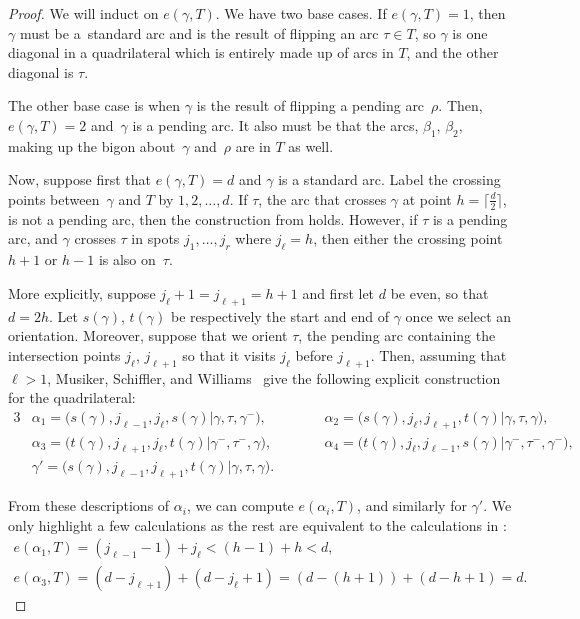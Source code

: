 \documentclass[11pt]{article}
\numberwithin{equation}{section}
\begin{document}
\begin{proof}We will induct on $e(\gamma, T)$. We have two base cases. If $e(\gamma, T) = 1$, then $\gamma$ must be a~standard arc and is the result of flipping an arc $\tau \in T$, so $\gamma$ is one diagonal in a quadrilateral which is entirely made up of arcs in $T$, and the other diagonal is $\tau$.

The other base case is when $\gamma$ is the result of flipping a pending arc~$\rho$. Then, $e(\gamma,T) = 2$ and~$\gamma$ is a pending arc. It also must be that the arcs, $\beta_1$, $\beta_2$, making up the bigon about~$\gamma$ and~$\rho$ are in $T$ as well.

 Now, suppose first that $e(\gamma, T) = d$ and $\gamma$ is a standard arc. Label the crossing points between~$\gamma$ and $T$ by $1,2, \ldots, d$. If $\tau$, the arc that crosses $\gamma$ at point $h = \lceil \frac{d}{2} \rceil$, is not a pending arc, then the construction from \cite[Lemma~9.1]{MSW} holds. However, if $\tau$ is a pending arc, and $\gamma$ crosses $\tau$ in spots $j_1,\ldots, j_r$ where $j_\ell = h$, then either the crossing point $h+1$ or $h-1$ is also on~$\tau$.

More explicitly, suppose $j_{\ell} + 1 = j_{\ell + 1} = h+1$ and first let $d$ be even, so that $d = 2h$. Let $s(\gamma)$, $t(\gamma)$ be respectively the start and end of $\gamma$ once we select an orientation. Moreover, suppose that we orient $\tau$, the pending arc containing the intersection points $j_\ell$, $j_{\ell + 1}$ so that it visits $j_\ell$ before $j_{\ell+1}$. Then, assuming that $\ell > 1$, Musiker, Schiffler, and Williams~\cite{MSW} give the following explicit construction for the quadrilateral:
\begin{alignat*}{3}
 & \alpha_1 = \big(s(\gamma), j_{\ell - 1}, j_\ell, s(\gamma) \vert \gamma, \tau, \gamma^-\big), \qquad &&
 \alpha_2 = \big(s(\gamma), j_\ell, j_{\ell + 1}, t(\gamma) \vert \gamma, \tau, \gamma\big), & \\
 & \alpha_3 = \big(t(\gamma), j_{\ell+1}, j_\ell, t(\gamma) \vert \gamma^-, \tau^-, \gamma\big), \qquad &&
 \alpha_4 = \big(t(\gamma), j_\ell, j_{\ell - 1}, s(\gamma) \vert \gamma^-, \tau^-, \gamma^-\big), & \\
 &\gamma' = \big(s(\gamma), j_{\ell - 1}, j_{\ell + 1}, t(\gamma) \vert \gamma, \tau, \gamma\big).\qquad &&&
\end{alignat*}

From these descriptions of $\alpha_i$, we can compute $e(\alpha_i,T)$, and similarly for $\gamma'$. We only highlight a few calculations as the rest are equivalent to the calculations in \cite{MSW}:
\begin{gather*}
 e(\alpha_1,T)= (j_{\ell-1} - 1) + j_\ell < (h-1) + h < d ,\\
 e(\alpha_3,T)= (d - j_{\ell + 1}) + (d - j_{\ell} + 1) = (d - (h+1)) + (d - h + 1) = d.
\end{gather*}


\end{proof}
\end{document}
